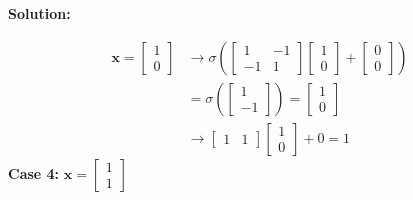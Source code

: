 \documentclass{article}
\newenvironment{solution}
  {\par\noindent\textbf{Solution:}\par}
  {\par}
\begin{document}
\begin{solution}
\[
\begin{aligned}
\mathbf{x}= \begin{bmatrix}
1 \\
0
\end{bmatrix} &\to \sigma(\begin{bmatrix}
1 & -1  \\
-1 & 1
\end{bmatrix}\begin{bmatrix}
1 \\
0
\end{bmatrix} + \begin{bmatrix}
0 \\
0
\end{bmatrix}) \\
&= \sigma(\begin{bmatrix}
1  \\
-1
\end{bmatrix}) = \begin{bmatrix}
1 \\
0
\end{bmatrix} \\ 
&\to \begin{bmatrix}
1 & 1
\end{bmatrix}\begin{bmatrix}
1 \\
0
\end{bmatrix}+0 = 1
\end{aligned}\]
\textbf{Case 4:} $\mathbf{x}= \begin{bmatrix}
1 \\
1
\end{bmatrix}$


\end{solution}
\end{document}
